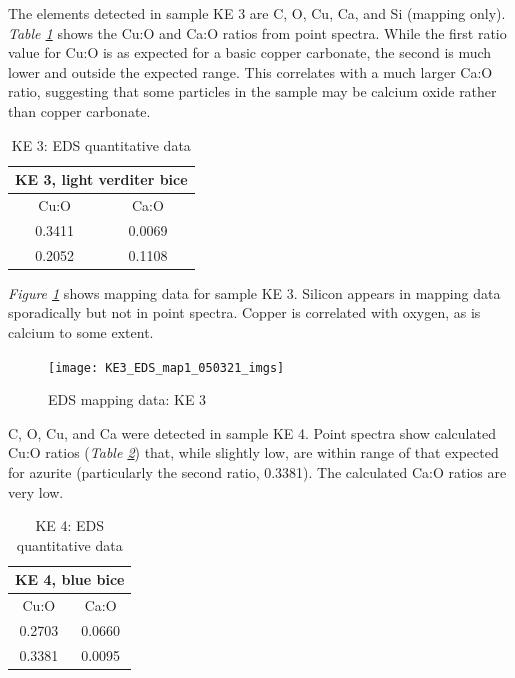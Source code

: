 
The elements detected in sample KE 3 are C, O, Cu, Ca, and Si (mapping only). \textit{Table \ref{table:ke3_ratios}} shows the Cu:O and Ca:O ratios from point spectra. While the first ratio value for Cu:O is as expected for a basic copper carbonate, the second is much lower and outside the expected range. This correlates with a much larger Ca:O ratio, suggesting that some particles in the sample may be calcium oxide rather than copper carbonate.

\begin{table}[H]
\caption{KE 3: EDS quantitative data}
\centering
\label{table:ke3_ratios}
\begin{tabular}{c c}
\toprule
\multicolumn{2}{c}{KE 3, light verditer bice} \\
\midrule
Cu:O & Ca:O \\
\midrule
0.3411 & 0.0069 \\
0.2052 & 0.1108 \\
\bottomrule
\end{tabular}
\end{table}

\textit{Figure \ref{fig:ke3_map1}} shows mapping data for sample KE 3. Silicon appears in mapping data sporadically but not in point spectra. Copper is correlated with oxygen, as is calcium to some extent.

\begin{figure}[H]
\centering
  \texttt{[image: KE3\_EDS\_map1\_050321\_imgs]}
\caption[EDS mapping data: KE 3]{EDS mapping data: KE 3}
\label{fig:ke3_map1}
\end{figure}


C, O, Cu, and Ca were detected in sample KE 4. Point spectra show calculated Cu:O ratios (\textit{Table \ref{table:ke4_ratios}}) that, while slightly low, are within range of that expected for azurite (particularly the second ratio, 0.3381). The calculated Ca:O ratios are very low.

\begin{table}[H]
\caption{KE 4: EDS quantitative data}
\centering
\label{table:ke4_ratios}
\begin{tabular}{c c}
\toprule
\multicolumn{2}{c}{KE 4, blue bice} \\
\midrule
Cu:O & Ca:O \\
\midrule
0.2703 & 0.0660 \\
0.3381 & 0.0095 \\
\bottomrule
\end{tabular}
\end{table}

